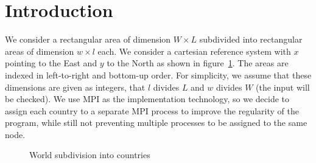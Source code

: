 \section{Introduction}
\label{sec:intro}

We consider a rectangular area of dimension $W \times L$ subdivided into rectangular areas of dimension $w \times l$ each. We consider a cartesian reference system with $x$ pointing to the East and $y$ to the North as shown in figure~\ref{fig:area_subdivision}. The areas are indexed in left-to-right and bottom-up order.
For simplicity, we assume that these dimensions are given as integers, that $l$ divides $L$ and $w$ divides $W$ (the input will be checked).
We use MPI as the implementation technology, so we decide to assign each country to a separate MPI process to improve the regularity of the program, while still not preventing multiple processes to be assigned to the same node.
\begin{figure}[h]
    \centering
    \begin{subfigure}[c]{0.7\textwidth}
    \end{subfigure}
    \begin{subfigure}[c]{0.29\textwidth}
    \end{subfigure}
    \caption{World subdivision into countries}
    \label{fig:area_subdivision}
\end{figure}

